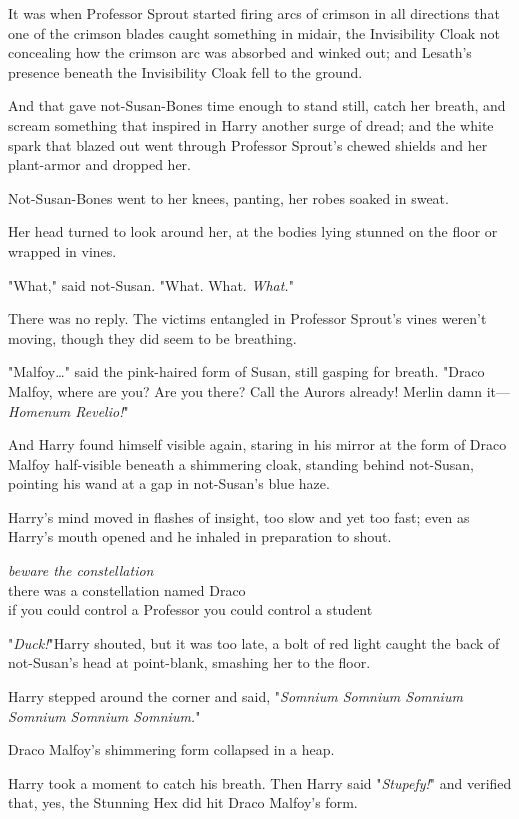 It was when Professor Sprout started firing arcs of crimson in all directions 
that one of the crimson blades caught something in midair, the Invisibility 
Cloak not concealing how the crimson arc was absorbed and winked out; and 
Lesath's presence beneath the Invisibility Cloak fell to the ground.

And that gave not-Susan-Bones time enough to stand still, catch her breath, and 
scream something that inspired in Harry another surge of dread; and the white 
spark that blazed out went through Professor Sprout's chewed shields and her 
plant-armor and dropped her.

Not-Susan-Bones went to her knees, panting, her robes soaked in sweat.

Her head turned to look around her, at the bodies lying stunned on the floor or 
wrapped in vines.

"What," said not-Susan. "What. What. \emph{What.}"

There was no reply. The victims entangled in Professor Sprout's vines weren't 
moving, though they did seem to be breathing.

"Malfoy{\ldots}" said the pink-haired form of Susan, still gasping for breath. 
"Draco Malfoy, where are you? Are you there? Call the Aurors already! Merlin 
damn it---\emph{Homenum Revelio!}"

And Harry found himself visible again, staring in his mirror at the form of 
Draco Malfoy half-visible beneath a shimmering cloak, standing behind 
not-Susan, pointing his wand at a gap in not-Susan's blue haze.

Harry's mind moved in flashes of insight, too slow and yet too fast; even as 
Harry's mouth opened and he inhaled in preparation to shout.

\noindent{}\emph{beware the constellation}\\
there was a constellation named Draco\\
if you could control a Professor you could control a student

"\emph{Duck!}"Harry shouted, but it was too late, a bolt of red light caught 
the back of not-Susan's head at point-blank, smashing her to the floor.

Harry stepped around the corner and said, "\emph{Somnium Somnium Somnium 
Somnium Somnium Somnium.}"

Draco Malfoy's shimmering form collapsed in a heap.

Harry took a moment to catch his breath. Then Harry said "\emph{Stupefy!}" and 
verified that, yes, the Stunning Hex did hit Draco Malfoy's form.

